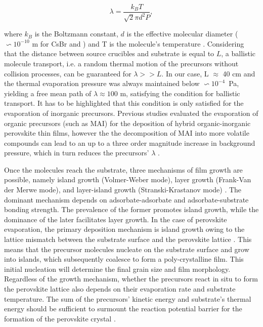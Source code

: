 \begin{equation}
    \lambda = \frac{k_BT}{\sqrt{2}\pi d^2P},
\end{equation}

 where $k_B$ is the Boltzmann constant, $d$ is the effective molecular diameter ($\backsim 10^{-10}$ m for CsBr and ) and T is the molecule's temperature \cite{Dong2023GrowthFilm}. Considering that the distance between source crucibles and substrate is equal to $L$, a ballistic molecule transport, i.e.  a random thermal motion of the precursors without collision processes, can be guaranteed for $\lambda >> L$. In our case, L $\approx$ 40 cm and the thermal evaporation pressure was always maintained below $\backsim 10^{-4}$~Pa, yielding a free mean path of $\lambda \approx 100$ m, satisfying the condition for ballistic transport. It has to be highlighted that this condition is only satisfied for the evaporation of inorganic precursors. Previous studies evaluated the evaporation of organic precursors (such as MAI) for the deposition of hybrid organic-inorganic perovskite thin films, however the the decomposition of MAI into more volatile compounds can lead to an up to a three order magnitude increase in background pressure, which in turn reduces the precursors' $\lambda$ \cite{Abzieher2021FromCells}.
 
 Once the molecules reach the substrate, three mechanisms of film growth are possible, namely island growth (Volmer-Weber mode), layer growth (Frank-Van der Merwe mode), and layer-island growth (Stranski-Krastanov mode) \cite{Wang2024ThermallyBeyond}. The dominant mechanism depends on adsorbate-adsorbate and adsorbate-substrate bonding strength. The prevalence of the former promotes island growth, while the dominance of the later facilitates layer growth. In the case of perovskite evaporation, the primary deposition mechanism is island growth owing to the lattice mismatch between the substrate surface and the perovskite lattice \cite{Chen2018AEfficiency}. This means that the precursor molecules nucleate on the substrate surface and grow into islands, which subsequently coalesce to form a poly-crystalline film. This initial nucleation will determine the final grain size and film morphology. Regardless of the growth mechanism, whether the precursors react in situ to form the perovskite lattice also depends on their evaporation rate and substrate temperature. The sum of the precursors' kinetic energy and substrate's thermal energy should be sufficient to surmount the reaction potential barrier for the formation of the perovskite crystal \cite{DongGrowthFilm}. 

